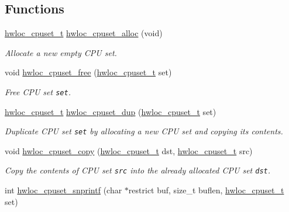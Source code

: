 \subsection*{Functions}
\begin{CompactItemize}
\item 
\hyperlink{group__hwlocality__cpuset_g82e51d695c430832b703dad5ab8d75e4}{hwloc\_\-cpuset\_\-t} \hyperlink{group__hwlocality__cpuset_g82803256c7e78369aad77a2a9e5599a2}{hwloc\_\-cpuset\_\-alloc} (void)
\begin{CompactList}\small\item\em Allocate a new empty CPU set. \item\end{CompactList}\item 
void \hyperlink{group__hwlocality__cpuset_gf5d5a9e082a43f8311fdcff55e611b23}{hwloc\_\-cpuset\_\-free} (\hyperlink{group__hwlocality__cpuset_g82e51d695c430832b703dad5ab8d75e4}{hwloc\_\-cpuset\_\-t} set)
\begin{CompactList}\small\item\em Free CPU set {\tt set}. \item\end{CompactList}\item 
\hyperlink{group__hwlocality__cpuset_g82e51d695c430832b703dad5ab8d75e4}{hwloc\_\-cpuset\_\-t} \hyperlink{group__hwlocality__cpuset_g19d8c163e4834ba69c808560aa5a89b3}{hwloc\_\-cpuset\_\-dup} (\hyperlink{group__hwlocality__cpuset_g82e51d695c430832b703dad5ab8d75e4}{hwloc\_\-cpuset\_\-t} set)
\begin{CompactList}\small\item\em Duplicate CPU set {\tt set} by allocating a new CPU set and copying its contents. \item\end{CompactList}\item 
void \hyperlink{group__hwlocality__cpuset_gdad3d25553afca090a81ffa270208f2e}{hwloc\_\-cpuset\_\-copy} (\hyperlink{group__hwlocality__cpuset_g82e51d695c430832b703dad5ab8d75e4}{hwloc\_\-cpuset\_\-t} dst, \hyperlink{group__hwlocality__cpuset_g82e51d695c430832b703dad5ab8d75e4}{hwloc\_\-cpuset\_\-t} src)
\begin{CompactList}\small\item\em Copy the contents of CPU set {\tt src} into the already allocated CPU set {\tt dst}. \item\end{CompactList}\item 
int \hyperlink{group__hwlocality__cpuset_gaa64dfeea7ff3c8427c88ac285be714e}{hwloc\_\-cpuset\_\-snprintf} (char $\ast$restrict buf, size\_\-t buflen, \hyperlink{group__hwlocality__cpuset_g82e51d695c430832b703dad5ab8d75e4}{hwloc\_\-cpuset\_\-t} set)

\end{CompactItemize}
